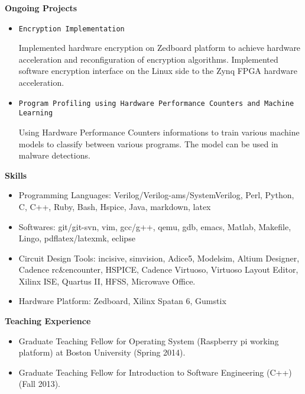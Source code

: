 \documentclass[]{article}
\begin{document}
\noindent \textbf{Ongoing Projects}
\begin{itemize}

		\item \verb+Encryption Implementation+

		Implemented hardware encryption on Zedboard platform to achieve
hardware acceleration and reconfiguration of encryption algorithms.
Implemented software encryption interface on the Linux side to the Zynq FPGA
hardware acceleration.

		\item \verb+Program Profiling using Hardware Performance Counters and Machine Learning+
		
		Using Hardware Performance Counters informations to train various
machine models to classify between various programs. The model can be used in
malware detections.

\end{itemize}

\noindent \textbf{Skills}
\begin{itemize}
\item Programming Languages:  Verilog/Verilog-ams/SystemVerilog, Perl, Python, C, C++, Ruby, Bash,
Hspice, Java, markdown, latex
\item Softwares: git/git-svn, vim, gcc/g++, qemu, gdb, emacs, Matlab, Makefile, Lingo,
pdflatex/latexmk, eclipse
\item Circuit Design Tools:  incisive, simvision, Adice5, Modelsim, Altium Designer, Cadence
rc$\&$encounter, HSPICE, Cadence Virtuoso, Virtuoso Layout Editor, Xilinx ISE, Quartus II, HFSS,
Microwave Office. 
\item Hardware Platform: Zedboard, Xilinx Spatan 6, Gumstix

\end{itemize}
\noindent \textbf{Teaching Experience}
\begin{itemize}
\item Graduate Teaching Fellow for Operating System (Raspberry pi working
platform) at Boston University (Spring 2014).
\item Graduate Teaching Fellow for Introduction to Software Engineering (C++)
(Fall 2013).
\end{itemize}
\end{document}
